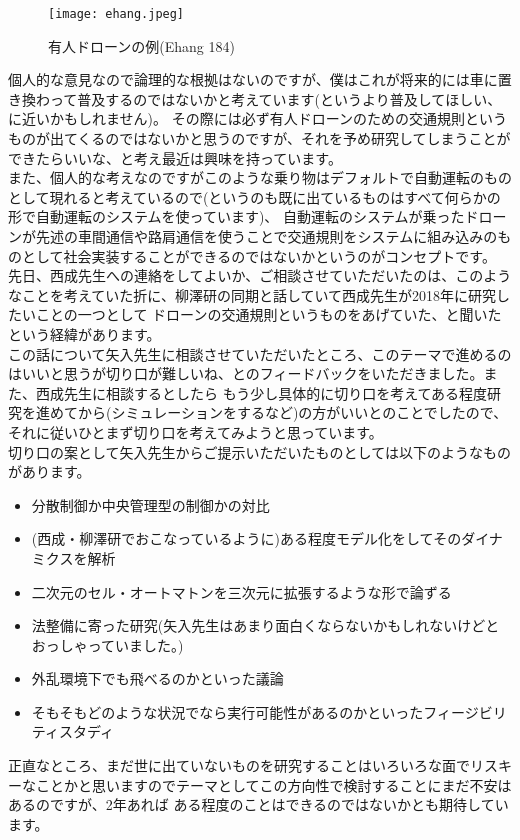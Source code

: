 \documentclass[a4paper,10pt]{jsarticle}
\begin{document}
\begin{figure}[htbp]
 \begin{center}
  \texttt{[image: ehang.jpeg]}
  \caption{有人ドローンの例(Ehang 184)}
  \label{fig:ehang}
 \end{center}
\end{figure}

個人的な意見なので論理的な根拠はないのですが、僕はこれが将来的には車に置き換わって普及するのではないかと考えています(というより普及してほしい、に近いかもしれません)。
その際には必ず有人ドローンのための交通規則というものが出てくるのではないかと思うのですが、それを予め研究してしまうことができたらいいな、と考え最近は興味を持っています。\\

また、個人的な考えなのですがこのような乗り物はデフォルトで自動運転のものとして現れると考えているので(というのも既に出ているものはすべて何らかの形で自動運転のシステムを使っています)、
自動運転のシステムが乗ったドローンが先述の車間通信や路肩通信を使うことで交通規則をシステムに組み込みのものとして社会実装することができるのではないかというのがコンセプトです。\\

先日、西成先生への連絡をしてよいか、ご相談させていただいたのは、このようなことを考えていた折に、柳澤研の同期と話していて西成先生が2018年に研究したいことの一つとして
ドローンの交通規則というものをあげていた、と聞いたという経緯があります。\\

この話について矢入先生に相談させていただいたところ、このテーマで進めるのはいいと思うが切り口が難しいね、とのフィードバックをいただきました。また、西成先生に相談するとしたら
もう少し具体的に切り口を考えてある程度研究を進めてから(シミュレーションをするなど)の方がいいとのことでしたので、それに従いひとまず切り口を考えてみようと思っています。\\

切り口の案として矢入先生からご提示いただいたものとしては以下のようなものがあります。

\begin{itemize}
 \item 分散制御か中央管理型の制御かの対比
 \item (西成・柳澤研でおこなっているように)ある程度モデル化をしてそのダイナミクスを解析
 \item 二次元のセル・オートマトンを三次元に拡張するような形で論ずる
 \item 法整備に寄った研究(矢入先生はあまり面白くならないかもしれないけどとおっしゃっていました。)
 \item 外乱環境下でも飛べるのかといった議論
 \item そもそもどのような状況でなら実行可能性があるのかといったフィージビリティスタディ
\end{itemize}

正直なところ、まだ世に出ていないものを研究することはいろいろな面でリスキーなことかと思いますのでテーマとしてこの方向性で検討することにまだ不安はあるのですが、2年あれば
ある程度のことはできるのではないかとも期待しています。



\end{document}
